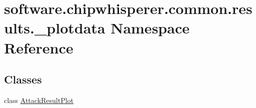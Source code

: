 \hypertarget{namespacesoftware_1_1chipwhisperer_1_1common_1_1results_1_1__plotdata}{}\section{software.\+chipwhisperer.\+common.\+results.\+\_\+plotdata Namespace Reference}
\label{namespacesoftware_1_1chipwhisperer_1_1common_1_1results_1_1__plotdata}
\subsection*{Classes}
\begin{DoxyCompactItemize}
\item 
class \hyperlink{classsoftware_1_1chipwhisperer_1_1common_1_1results_1_1__plotdata_1_1AttackResultPlot}{Attack\+Result\+Plot}
\end{DoxyCompactItemize}
